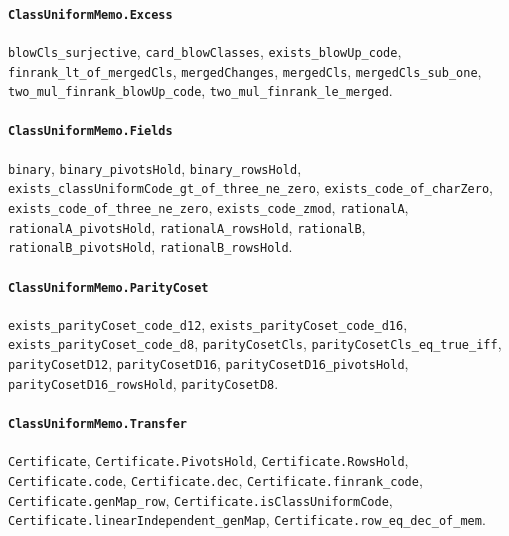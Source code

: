 \paragraph{\texttt{ClassUniformMemo.Excess}}
{\small\raggedright \texttt{blowCls\_surjective}, \texttt{card\_blowClasses}, \texttt{exists\_blowUp\_code}, \texttt{finrank\_lt\_of\_mergedCls}, \texttt{mergedChanges}, \texttt{mergedCls}, \texttt{mergedCls\_sub\_one}, \texttt{two\_mul\_finrank\_blowUp\_code}, \texttt{two\_mul\_finrank\_le\_merged}.\par}

\paragraph{\texttt{ClassUniformMemo.Fields}}
{\small\raggedright \texttt{binary}, \texttt{binary\_pivotsHold}, \texttt{binary\_rowsHold}, \texttt{exists\_classUniformCode\_gt\_of\_three\_ne\_zero}, \texttt{exists\_code\_of\_charZero}, \texttt{exists\_code\_of\_three\_ne\_zero}, \texttt{exists\_code\_zmod}, \texttt{rationalA}, \texttt{rationalA\_pivotsHold}, \texttt{rationalA\_rowsHold}, \texttt{rationalB}, \texttt{rationalB\_pivotsHold}, \texttt{rationalB\_rowsHold}.\par}

\paragraph{\texttt{ClassUniformMemo.ParityCoset}}
{\small\raggedright \texttt{exists\_parityCoset\_code\_d12}, \texttt{exists\_parityCoset\_code\_d16}, \texttt{exists\_parityCoset\_code\_d8}, \texttt{parityCosetCls}, \texttt{parityCosetCls\_eq\_true\_iff}, \texttt{parityCosetD12}, \texttt{parityCosetD16}, \texttt{parityCosetD16\_pivotsHold}, \texttt{parityCosetD16\_rowsHold}, \texttt{parityCosetD8}.\par}

\paragraph{\texttt{ClassUniformMemo.Transfer}}
{\small\raggedright \texttt{Certificate}, \texttt{Certificate.PivotsHold}, \texttt{Certificate.RowsHold}, \texttt{Certificate.code}, \texttt{Certificate.dec}, \texttt{Certificate.finrank\_code}, \texttt{Certificate.genMap\_row}, \texttt{Certificate.isClassUniformCode}, \texttt{Certificate.linearIndependent\_genMap}, \texttt{Certificate.row\_eq\_dec\_of\_mem}.\par}
